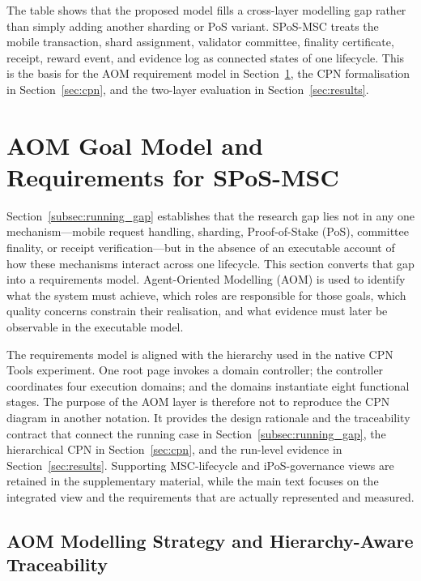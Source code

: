 \documentclass[a4paper,fleqn]{cas-sc}
\begin{document}
The table shows that the proposed model fills a cross-layer modelling gap rather than simply adding another sharding or PoS variant. SPoS-MSC treats the mobile transaction, shard assignment, validator committee, finality certificate, receipt, reward event, and evidence log as connected states of one lifecycle. This is the basis for the AOM requirement model in Section~\ref{sec:aom}, the CPN formalisation in Section~\ref{sec:cpn}, and the two-layer evaluation in Section~\ref{sec:results}.



\section{AOM Goal Model and Requirements for SPoS-MSC}
\label{sec:aom}

Section~\ref{subsec:running_gap} establishes that the research gap lies not in
any one mechanism---mobile request handling, sharding, Proof-of-Stake (PoS),
committee finality, or receipt verification---but in the absence of an
executable account of how these mechanisms interact across one lifecycle. This
section converts that gap into a requirements model. Agent-Oriented Modelling
(AOM) is used to identify what the system must achieve, which roles are
responsible for those goals, which quality concerns constrain their
realisation, and what evidence must later be observable in the executable
model.

The requirements model is aligned with the hierarchy used in the native
CPN Tools experiment. One root page invokes a domain controller; the controller
coordinates four execution domains; and the domains instantiate eight
functional stages. The purpose of the AOM layer is therefore not to reproduce
the CPN diagram in another notation. It provides the design rationale and the
traceability contract that connect the running case in Section~\ref{subsec:running_gap},
the hierarchical CPN in Section~\ref{sec:cpn}, and the run-level evidence in
Section~\ref{sec:results}. Supporting MSC-lifecycle and iPoS-governance views are
retained in the supplementary material, while the main text focuses on the
integrated view and the requirements that are actually represented and
measured.

\subsection{AOM Modelling Strategy and Hierarchy-Aware Traceability}
\label{subsec:aom_strategy}
\end{document}
